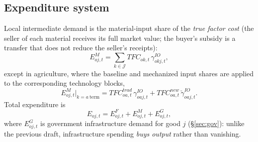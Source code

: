 \documentclass[11pt]{article}
\newcommand{\Sct}{\mathcal{J}}
\begin{document}
\subsection{Expenditure system}
Local intermediate demand is the material-input share of the \emph{true factor cost}
(the seller of each material receives its full market value; the buyer's subsidy is a
transfer that does not reduce the seller's receipts):
\begin{equation}
  E^{M}_{oj,t} = \sum_{k \in \Sct} TFC_{ok,t}\, \gamma^{IO}_{okj,t},
\end{equation}
except in agriculture, where the baseline and mechanized input shares are applied to the
corresponding technology blocks,
\begin{equation}
  E^{M}_{oj,t}\big|_{k=a\ \text{term}}
  = TFC^{trad}_{oa,t}\, \gamma^{IO}_{oaj,t}
  + TFC^{new}_{oa,t}\, \breve\gamma^{IO}_{oaj,t}.
\end{equation}
Total expenditure is
\begin{equation}
  E_{oj,t} = E^{F}_{oj,t} + E^{M}_{oj,t} + E^{G}_{oj,t},
\end{equation}
where $E^{G}_{oj,t}$ is government infrastructure demand for good $j$ (\S\ref{sec:gov}): unlike the
previous draft, infrastructure spending \emph{buys output} rather than vanishing.
\end{document}

